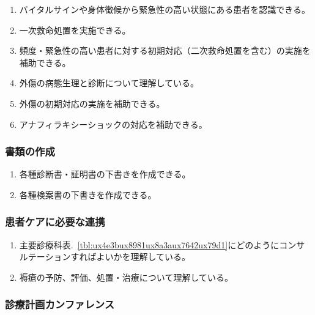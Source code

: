 \begin{enumerate}
\def\labelenumi{\arabic{enumi}.}
\tightlist
\item
  バイタルサインや身体徴候から緊急性の高い状態にある患者を認識できる。
\item
  一次救命処置を実施できる。
\item
  頻度・緊急性の高い患者に対する初期対応（二次救命処置を含む）の実施を補助できる。
\item
  外傷の病態生理と診断について理解している。
\item
  外傷の初期対応の実施を補助できる。
\item
  アナフィラキシーショックの対応を補助できる。
\end{enumerate}

\hypertarget{ux66f8ux985eux306eux4f5cux6210}{%
\subsubsection{書類の作成}\label{ux66f8ux985eux306eux4f5cux6210}}

\begin{enumerate}
\def\labelenumi{\arabic{enumi}.}
\tightlist
\item
  各種診断書・証明書の下書きを作成できる。
\item
  各種検案書の下書きを作成できる。
\end{enumerate}

\hypertarget{ux60a3ux8005ux30b1ux30a2ux306bux5fc5ux8981ux306aux9023ux643a}{%
\subsubsection{患者ケアに必要な連携}\label{ux60a3ux8005ux30b1ux30a2ux306bux5fc5ux8981ux306aux9023ux643a}}

\begin{enumerate}
\def\labelenumi{\arabic{enumi}.}
\tightlist
\item
  主要診療科表.~\ref{tbl:ux4e3bux8981ux8a3aux7642ux79d1}にどのようにコンサルテーションすればよいかを理解している。
\item
  褥瘡の予防、評価、処置・治療について理解している。
\end{enumerate}

\hypertarget{ux8a3aux7642ux8a08ux753bux30abux30f3ux30d5ux30a1ux30ecux30f3ux30b9}{%
\subsubsection{診療計画カンファレンス}\label{ux8a3aux7642ux8a08ux753bux30abux30f3ux30d5ux30a1ux30ecux30f3ux30b9}}

